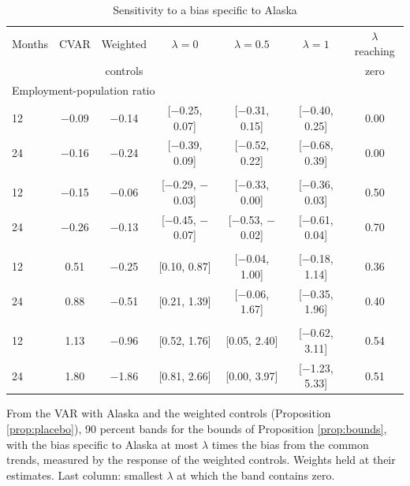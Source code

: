 \begin{table}[htbp]
\centering
\caption{Sensitivity to a bias specific to Alaska\label{tab:ak-bounds}}
\footnotesize
\begin{tabular}{lcccccc}
\toprule
Months & CVAR & Weighted & $\lambda=0$ & $\lambda=0.5$ & $\lambda=1$ & $\lambda$ reaching \\
 & & controls & & & & zero \\
\midrule
\multicolumn{7}{l}{Employment-population ratio} \\
12 & $-$0.09 & $-$0.14 & [$-$0.25, 0.07] & [$-$0.31, 0.15] & [$-$0.40, 0.25] & 0.00 \\
24 & $-$0.16 & $-$0.24 & [$-$0.39, 0.09] & [$-$0.52, 0.22] & [$-$0.68, 0.39] & 0.00 \\
\addlinespace
\multicolumn{7}{l}{Participation rate} \\
12 & $-$0.15 & $-$0.06 & [$-$0.29, $-$0.03] & [$-$0.33, 0.00] & [$-$0.36, 0.03] & 0.50 \\
24 & $-$0.26 & $-$0.13 & [$-$0.45, $-$0.07] & [$-$0.53, $-$0.02] & [$-$0.61, 0.04] & 0.70 \\
\addlinespace
\multicolumn{7}{l}{Payroll employment} \\
12 & 0.51 & $-$0.25 & [0.10, 0.87] & [$-$0.04, 1.00] & [$-$0.18, 1.14] & 0.36 \\
24 & 0.88 & $-$0.51 & [0.21, 1.39] & [$-$0.06, 1.67] & [$-$0.35, 1.96] & 0.40 \\
\addlinespace
\multicolumn{7}{l}{Leisure and hospitality} \\
12 & 1.13 & $-$0.96 & [0.52, 1.76] & [0.05, 2.40] & [$-$0.62, 3.11] & 0.54 \\
24 & 1.80 & $-$1.86 & [0.81, 2.66] & [0.00, 3.97] & [$-$1.23, 5.33] & 0.51 \\
\bottomrule
\end{tabular}
\par\smallskip\parbox{0.95\textwidth}{\footnotesize From the VAR with Alaska and the weighted controls (Proposition \ref{prop:placebo}), 90 percent bands for the bounds of Proposition \ref{prop:bounds}, with the bias specific to Alaska at most $\lambda$ times the bias from the common trends, measured by the response of the weighted controls. Weights held at their estimates. Last column: smallest $\lambda$ at which the band contains zero.}
\end{table}
